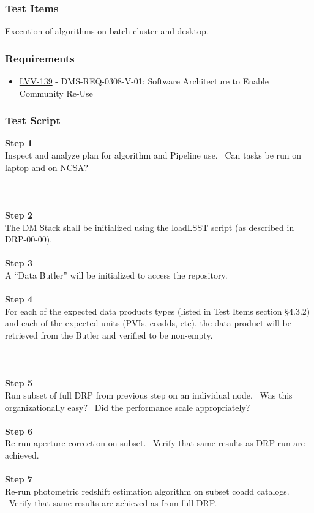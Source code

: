\hypertarget{test-items-24}{%
\subsubsection{Test Items}\label{test-items-24}}

Execution of algorithms on batch cluster and desktop.

\hypertarget{requirements-24}{%
\subsubsection{Requirements}\label{requirements-24}}

\begin{itemize}
\tightlist
\item
  \href{https://jira.lsstcorp.org/browse/LVV-139}{LVV-139} -
  DMS-REQ-0308-V-01: Software Architecture to Enable Community Re-Use
\end{itemize}

\hypertarget{test-script-24}{%
\subsubsection{Test Script}\label{test-script-24}}

\textbf{Step 1}\\
Inspect and analyze plan for algorithm and Pipeline use. ~Can tasks be
run on laptop and on NCSA?\\
~\\
~\\
~\\
\textbf{Step 2}\\
The DM Stack shall be initialized using the loadLSST script (as
described in DRP-00-00).\\
~\\
\textbf{Step 3}\\
A ``Data Butler'' will be initialized to access the repository.\\
~\\
\textbf{Step 4}\\
For each of the expected data products types (listed in Test Items
section §4.3.2) and each of the expected units (PVIs, coadds, etc), the
data product will be retrieved from the Butler and verified to be
non-empty.\\
~\\
~\\
~\\
\textbf{Step 5}\\
Run subset of full DRP from previous step on an individual node. ~Was
this organizationally easy? ~Did the performance scale appropriately?\\
~\\
\textbf{Step 6}\\
Re-run aperture correction on subset. ~Verify that same results as DRP
run are achieved.\\
~\\
\textbf{Step 7}\\
Re-run photometric redshift estimation algorithm on subset coadd
catalogs. ~Verify that same results are achieved as from full DRP.\\
~\\

